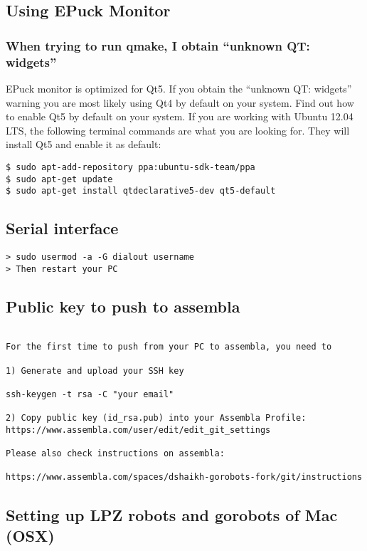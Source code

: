 \subsection{Using EPuck Monitor}

\subsubsection{When trying to run qmake, I obtain ``unknown QT: widgets''}
EPuck monitor is optimized for Qt5. If you obtain the ``unknown QT: widgets'' warning you are most likely using Qt4 by default on your system. Find out how to enable Qt5 by default on your system. If you are working with Ubuntu 12.04 LTS, the following terminal commands are what you are looking for. They will install Qt5 and enable it as default:
\begin{lstlisting}
$ sudo apt-add-repository ppa:ubuntu-sdk-team/ppa
$ sudo apt-get update
$ sudo apt-get install qtdeclarative5-dev qt5-default
\end{lstlisting}


\subsection{Serial interface}
\begin{lstlisting}
> sudo usermod -a -G dialout username
> Then restart your PC

\end{lstlisting}

\subsection{Public key to push to assembla}
\begin{lstlisting}

For the first time to push from your PC to assembla, you need to

1) Generate and upload your SSH key

ssh-keygen -t rsa -C "your email"

2) Copy public key (id_rsa.pub) into your Assembla Profile:
https://www.assembla.com/user/edit/edit_git_settings

Please also check instructions on assembla:

https://www.assembla.com/spaces/dshaikh-gorobots-fork/git/instructions
\end{lstlisting}



\subsection{Setting up LPZ robots and gorobots of Mac (OSX)}

